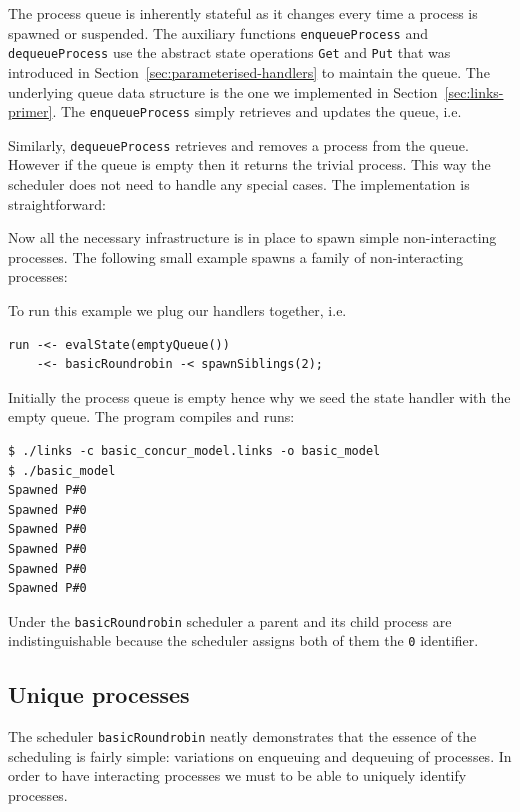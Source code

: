 \documentclass[12pt,mscres,cdtppar,twoside,openright,logo,rightchapter,normalheadings]{infthesis}
\newcommand{\snippet}[1]{}
\theoremstyle{definition}
\begin{document}
The process queue is inherently stateful as it changes every time a
process is spawned or suspended.  The auxiliary functions
\lstinline$enqueueProcess$ and \lstinline$dequeueProcess$ use the
abstract state operations \lstinline$Get$ and \lstinline$Put$ that was
introduced in Section~\ref{sec:parameterised-handlers} to maintain the
queue. The underlying queue data structure is the one we implemented
in Section~\ref{sec:links-primer}. The \lstinline$enqueueProcess$
simply retrieves and updates the queue, i.e.
%
\snippet{enqueueProcess.links}
%
Similarly, \lstinline$dequeueProcess$ retrieves and removes a process
from the queue. However if the queue is empty then it returns the
trivial process. This way the scheduler does not need to handle any
special cases. The implementation is straightforward:
%
\snippet{dequeueProcess.links}
%
Now all the necessary infrastructure is in place to spawn simple
non-interacting processes. The following small example spawns a family
of non-interacting processes:
%
\snippet{spawnSiblings.links}
%
To run this example we plug our handlers together, i.e.
%
\begin{lstlisting}
run -<- evalState(emptyQueue()) 
    -<- basicRoundrobin -< spawnSiblings(2);
\end{lstlisting}
%
Initially the process queue is empty hence why we seed the state
handler with the empty queue. The program compiles and runs:
%
\begin{lstlisting}[style=terminal]
$ ./links -c basic_concur_model.links -o basic_model
$ ./basic_model
Spawned P#0
Spawned P#0
Spawned P#0
Spawned P#0
Spawned P#0
Spawned P#0
\end{lstlisting}
%
Under the \lstinline$basicRoundrobin$ scheduler a parent and its child
process are indistinguishable because the scheduler assigns both of
them the \lstinline$0$ identifier.

\subsection{Unique processes}

The scheduler \lstinline$basicRoundrobin$ neatly demonstrates that the
essence of the scheduling is fairly simple: variations on enqueuing
and dequeuing of processes. In order to have interacting processes we
must to be able to uniquely identify processes.

\end{document}
